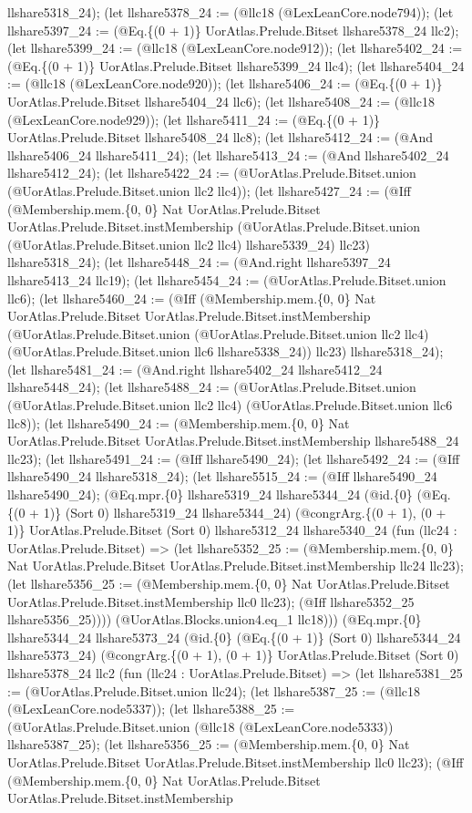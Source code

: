 \documentclass[11pt]{article}
\begin{document}
llshare5318\_24); (let llshare5378\_24 := (@llc18 (@LexLeanCore.node794)); (let llshare5397\_24 := (@Eq.\{(0 + 1)\} UorAtlas.Prelude.Bitset llshare5378\_24 llc2); (let llshare5399\_24 := (@llc18 (@LexLeanCore.node912)); (let llshare5402\_24 := (@Eq.\{(0 + 1)\} UorAtlas.Prelude.Bitset llshare5399\_24 llc4); (let llshare5404\_24 := (@llc18 (@LexLeanCore.node920)); (let llshare5406\_24 := (@Eq.\{(0 + 1)\} UorAtlas.Prelude.Bitset llshare5404\_24 llc6); (let llshare5408\_24 := (@llc18 (@LexLeanCore.node929)); (let llshare5411\_24 := (@Eq.\{(0 + 1)\} UorAtlas.Prelude.Bitset llshare5408\_24 llc8); (let llshare5412\_24 := (@And llshare5406\_24 llshare5411\_24); (let llshare5413\_24 := (@And llshare5402\_24 llshare5412\_24); (let llshare5422\_24 := (@UorAtlas.Prelude.Bitset.union (@UorAtlas.Prelude.Bitset.union llc2 llc4)); (let llshare5427\_24 := (@Iff (@Membership.mem.\{0, 0\} Nat UorAtlas.Prelude.Bitset UorAtlas.Prelude.Bitset.instMembership (@UorAtlas.Prelude.Bitset.union (@UorAtlas.Prelude.Bitset.union llc2 llc4) llshare5339\_24) llc23) llshare5318\_24); (let llshare5448\_24 := (@And.right llshare5397\_24 llshare5413\_24 llc19); (let llshare5454\_24 := (@UorAtlas.Prelude.Bitset.union llc6); (let llshare5460\_24 := (@Iff (@Membership.mem.\{0, 0\} Nat UorAtlas.Prelude.Bitset UorAtlas.Prelude.Bitset.instMembership (@UorAtlas.Prelude.Bitset.union (@UorAtlas.Prelude.Bitset.union llc2 llc4) (@UorAtlas.Prelude.Bitset.union llc6 llshare5338\_24)) llc23) llshare5318\_24); (let llshare5481\_24 := (@And.right llshare5402\_24 llshare5412\_24 llshare5448\_24); (let llshare5488\_24 := (@UorAtlas.Prelude.Bitset.union (@UorAtlas.Prelude.Bitset.union llc2 llc4) (@UorAtlas.Prelude.Bitset.union llc6 llc8)); (let llshare5490\_24 := (@Membership.mem.\{0, 0\} Nat UorAtlas.Prelude.Bitset UorAtlas.Prelude.Bitset.instMembership llshare5488\_24 llc23); (let llshare5491\_24 := (@Iff llshare5490\_24); (let llshare5492\_24 := (@Iff llshare5490\_24 llshare5318\_24); (let llshare5515\_24 := (@Iff llshare5490\_24 llshare5490\_24); (@Eq.mpr.\{0\} llshare5319\_24 llshare5344\_24 (@id.\{0\} (@Eq.\{(0 + 1)\} (Sort 0) llshare5319\_24 llshare5344\_24) (@congrArg.\{(0 + 1), (0 + 1)\} UorAtlas.Prelude.Bitset (Sort 0) llshare5312\_24 llshare5340\_24 (fun (llc24 : UorAtlas.Prelude.Bitset) => (let llshare5352\_25 := (@Membership.mem.\{0, 0\} Nat UorAtlas.Prelude.Bitset UorAtlas.Prelude.Bitset.instMembership llc24 llc23); (let llshare5356\_25 := (@Membership.mem.\{0, 0\} Nat UorAtlas.Prelude.Bitset UorAtlas.Prelude.Bitset.instMembership llc0 llc23); (@Iff llshare5352\_25 llshare5356\_25)))) (@UorAtlas.Blocks.union4.eq\_1 llc18))) (@Eq.mpr.\{0\} llshare5344\_24 llshare5373\_24 (@id.\{0\} (@Eq.\{(0 + 1)\} (Sort 0) llshare5344\_24 llshare5373\_24) (@congrArg.\{(0 + 1), (0 + 1)\} UorAtlas.Prelude.Bitset (Sort 0) llshare5378\_24 llc2 (fun (llc24 : UorAtlas.Prelude.Bitset) => (let llshare5381\_25 := (@UorAtlas.Prelude.Bitset.union llc24); (let llshare5387\_25 := (@llc18 (@LexLeanCore.node5337)); (let llshare5388\_25 := (@UorAtlas.Prelude.Bitset.union (@llc18 (@LexLeanCore.node5333)) llshare5387\_25); (let llshare5356\_25 := (@Membership.mem.\{0, 0\} Nat UorAtlas.Prelude.Bitset UorAtlas.Prelude.Bitset.instMembership llc0 llc23); (@Iff (@Membership.mem.\{0, 0\} Nat UorAtlas.Prelude.Bitset UorAtlas.Prelude.Bitset.instMembership 
\end{document}
